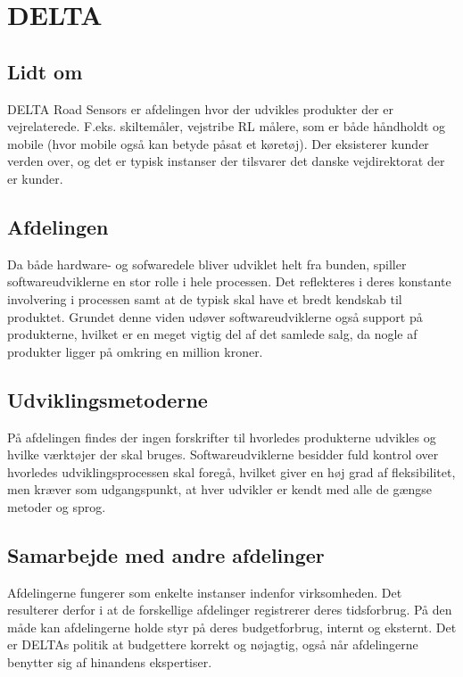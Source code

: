 \section{DELTA}

\subsection{Lidt om}
DELTA Road Sensors er afdelingen hvor der udvikles produkter der er vejrelaterede. F.eks. skiltemåler, vejstribe RL målere, som er både håndholdt og mobile (hvor mobile også kan betyde påsat et køretøj). Der eksisterer kunder verden over, og det er typisk instanser der tilsvarer det danske vejdirektorat der er kunder.

\subsection{Afdelingen}
Da både hardware- og sofwaredele bliver udviklet helt fra bunden, spiller softwareudviklerne en stor rolle i hele processen. Det reflekteres i deres konstante involvering i processen samt at de typisk skal have et bredt kendskab til produktet. Grundet denne viden udøver softwareudviklerne også support på produkterne, hvilket er en meget vigtig del af det samlede salg, da nogle af produkter ligger på omkring en million kroner.

\subsection{Udviklingsmetoderne}
På afdelingen findes der ingen forskrifter til hvorledes produkterne udvikles og hvilke værktøjer der skal bruges. Softwareudviklerne besidder fuld kontrol over hvorledes udviklingsprocessen skal foregå, hvilket giver en høj grad af fleksibilitet, men kræver som udgangspunkt, at hver udvikler er kendt med alle de gængse metoder og sprog.

\subsection{Samarbejde med andre afdelinger}
Afdelingerne fungerer som enkelte instanser indenfor virksomheden.
Det resulterer derfor i at de forskellige afdelinger registrerer deres tidsforbrug. På den måde kan afdelingerne holde styr på deres budgetforbrug, internt og eksternt. Det er DELTAs politik at budgettere korrekt og nøjagtig, også når afdelingerne benytter sig af hinandens ekspertiser.  




